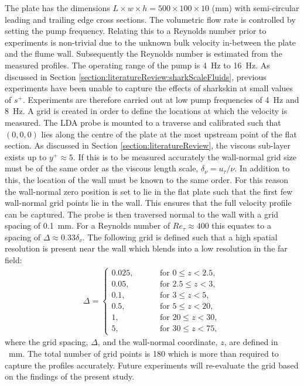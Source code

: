 \documentclass[12pt,oneside,a4paper]{article}
\begin{document}
The plate has the dimensions $L \times w \times h = 500 \times 100 \times 10 $ (mm) with semi-circular leading and trailing edge cross sections. The volumetric flow rate is controlled by setting the pump frequency. Relating this to a Reynolds number prior to experiments is non-trivial due to the unknown bulk velocity in-between the plate and the flume wall. Subsequently the Reynolds number is estimated from the measured profiles. The operating range of the pump is \SI{4}{Hz} to \SI{16}{Hz}. As discussed in Section \ref{section:literatureReview:sharkScaleFluids}, previous experiments have been unable to capture the effects of sharkskin at small values of $s^+$. Experiments are therefore carried out at low pump frequencies of \SI{4}{Hz} and \SI{8}{Hz}. A grid is created in order to define the locations at which the velocity is measured. The LDA probe is mounted to a traverse and calibrated such that $(0,0,0)$ lies along the centre of the plate at the most upstream point of the flat section. As discussed in Section \ref{section:literatureReview}, the viscous sub-layer exists up to $y^+ \approx 5$. If this is to be measured accurately the wall-normal grid size must be of the same order as the viscous length scale, $\delta_\nu = u_\tau / \nu$. In addition to this, the location of the wall must be known to the same order. For this reason the wall-normal zero position is set to lie in the flat plate such that the first few wall-normal grid points lie in the wall. This ensures that the full velocity profile can be captured. The probe is then traversed normal to the wall with a grid spacing of \SI{0.1}{mm}. For a Reynolds number of $Re_\tau \approx 400$ this equates to a spacing of $\Delta \approx 0.33 \delta_v$. The following grid is defined such that a high spatial resolution is present near the wall which blends into a low resolution in the far field:
\begin{align*}
\Delta = 
\begin{cases}
0.025, \hspace{1cm} &\text{for } 0 \leqslant z < 2.5,\\
0.05, \hspace{1cm} &\text{for } 2.5 \leqslant z < 3,\\
0.1, \hspace{1cm} &\text{for } 3 \leqslant z < 5,\\
0.5, \hspace{1cm} &\text{for } 5 \leqslant z < 20,\\
1, \hspace{1cm} &\text{for } 20 \leqslant z < 30,\\
5, \hspace{1cm} &\text{for } 30 \leqslant z < 75,
\end{cases}
\end{align*}
where the grid spacing, $\Delta$, and the wall-normal coordinate, $z$, are defined in \SI{}{mm}. The total number of grid points is 180 which is more than required to capture the profiles accurately. Future experiments will re-evaluate the grid based on the findings of the present study.
\end{document}
